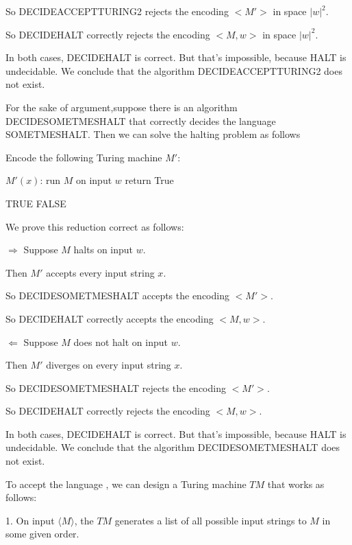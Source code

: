 \documentclass[12pt,a4paper]{article}
\newcommand{\question}[1]{\bigskip\noindent{\textbf{Q{#1} solution}}}
\begin{document}
	 So DECIDEACCEPTTURING2 rejects the encoding $<M'>$ in space ${|w|}^2$.

	 So DECIDEHALT correctly rejects the encoding $<M,w>$ in space ${|w|}^2$.

In both cases, DECIDEHALT is correct. But that's impossible, because HALT is undecidable. We conclude that the algorithm DECIDEACCEPTTURING2 does not exist.

\question{36.A}

For the sake of argument,suppose there is an algorithm DECIDESOMETMESHALT that correctly decides the language SOMETMESHALT. Then we can solve the halting problem as follows
\begin{algorithm}
	\begin{algorithmic}
		\State Encode the following Turing machine $M'$:

		\State\quad$M'(x)$:
		\State\quad\quad run $M$ on input $w$
		\State\quad\quad return True
		
		\State \Return TRUE
		\Else{}
		\State \Return FALSE 
		\EndIf
		\EndFunction
	\end{algorithmic}
\end{algorithm}

We prove this reduction correct as follows:

$\Longrightarrow$ Suppose $M$ halts on input $w$.
     
	  Then $M'$ accepts every input string $x$.


	  So DECIDESOMETMESHALT accepts the encoding $<M'>$.

	  So DECIDEHALT correctly accepts the encoding $<M,w>$.


$\Longleftarrow$ Suppose $M$ does not halt on input $w$.

     Then $M'$ diverges on every input string $x$.


	 So DECIDESOMETMESHALT rejects the encoding $<M'>$.

	 So DECIDEHALT correctly rejects the encoding $<M,w>$.

In both cases, DECIDEHALT is correct. But that's impossible, because HALT is undecidable. We conclude that the algorithm DECIDESOMETMESHALT does not exist.

\question{36.B}

To accept the language , we can design a Turing machine $TM$ that works as follows:

1. On input $⟨M⟩$, the $TM$ generates a list of all possible input strings to $M$ in some given order.
\end{document}
